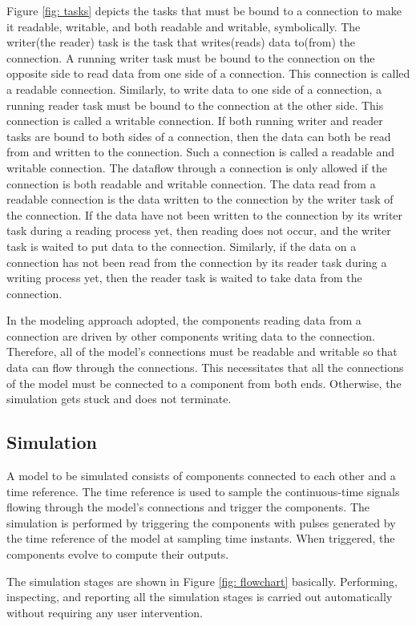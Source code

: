 \documentclass{juliacon}
\begin{document}
Figure \ref{fig: tasks} depicts the tasks that must be bound to a connection to make it readable, writable, and both readable and writable, symbolically. The writer(the reader) task is the task that writes(reads) data to(from) the connection. A running writer task must be bound to the connection on the opposite side to read data from one side of a connection. This connection is called a readable connection. Similarly, to write data to one side of a connection, a running reader task must be bound to the connection at the other side. This connection is called a writable connection. If both running writer and reader tasks are bound to both sides of a connection, then the data can both be read from and written to the connection. Such a connection is called a readable and writable connection. The dataflow through a connection is only allowed if the connection is both readable and writable connection. The data read from a readable connection is the data written to the connection by the writer task of the connection. If the data have not been written to the connection by its writer task during a reading process yet, then reading does not occur, and the writer task is waited to put data to the connection. Similarly, if the data on a connection has not been read from the connection by its reader task during a writing process yet, then the reader task is waited to take data from the connection.

In the modeling approach adopted, the components reading data from a connection are driven by other components writing data to the connection. Therefore, all of the model's connections must be readable and writable so that data can flow through the connections. This necessitates that all the connections of the model must be connected to a component from both ends. Otherwise, the simulation gets stuck and does not terminate.

\subsection{Simulation}
A model to be simulated consists of components connected to each other and a time reference. The time reference is used to sample the continuous-time signals flowing through the model's connections and trigger the components. The simulation is performed by triggering the components with pulses generated by the time reference of the model at sampling time instants. When triggered, the components evolve to compute their outputs.

The simulation stages are shown in Figure \ref{fig: flowchart} basically. Performing, inspecting, and reporting all the simulation stages is carried out automatically without requiring any user intervention.
\end{document}

